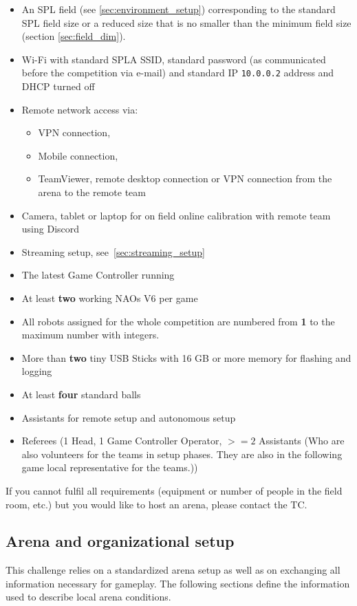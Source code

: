\begin{itemize}
    \item An SPL field (see \ref{sec:environment_setup}) corresponding to the standard SPL field size or a reduced size that is no smaller than the minimum field size (\cf section \ref{sec:field_dim}).
	\item Wi-Fi with standard SPL\textunderscore A SSID, standard password (as communicated before the competition via e-mail) and standard IP \texttt{10.0.0.2} address and DHCP turned off
    \item Remote network access via:
    \begin{itemize}
        \item VPN connection,
        \item Mobile connection,
        \item TeamViewer, remote desktop connection or VPN connection from the arena to the remote team
    \end{itemize}
    \item Camera, tablet or laptop for on field online calibration with remote team using Discord
    \item Streaming setup, see~\ref{sec:streaming_setup}
	\item The latest Game Controller running
    \item At least \textbf{two} working NAOs V6 per game
    \item All robots assigned for the whole competition are numbered from \textbf{1} to the maximum number with integers.
    \item More than \textbf{two} tiny USB Sticks with 16 GB or more memory for flashing and logging
    \item At least \textbf{four} standard balls
    \item Assistants for remote setup and autonomous setup
    \item Referees (1 Head, 1 Game Controller Operator, $>= 2$ Assistants (Who are also volunteers for the teams in setup phases. They are also in the following game local representative for the teams.))
\end{itemize}

If you cannot fulfil all requirements (equipment or number of people in the field room, etc.) but you would like to host an arena, please contact the TC.

\subsection{Arena and organizational setup}
\label{sec:arean-org-setup}
This challenge relies on a standardized arena setup as well as on exchanging all information necessary for gameplay. The following sections define the information used to describe local arena conditions.


